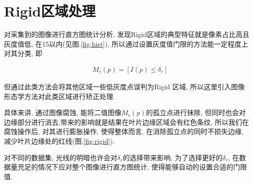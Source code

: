 
\section{Rigid区域处理}

对采集到的图像进行直方图统计分析, 发现Rigid区域的典型特征就是像素占比高且灰度值低, 在15以内(见图.\ref{fig:hist}),  所以通过设置灰度值门限的方法能一定程度上对其分类, 即

\begin{eqnarray}
	\quad M_r(p) = [I(p) \le \delta_r ]
\end{eqnarray}


但通过此类方法会将其他区域一些低灰度点误判为Rigid 区域, 所以这里引入图像形态学方法\cite{GonzalezW08}对此类区域进行矫正处理.


具体来讲, 通过图像腐蚀, 能将二值图像$M_r(p)$的孤立点进行抹除, 但同时也会对边缘部分进行消去,带来的影响就是结果在叶片边缘区域会有红色条纹, 所以我们在腐蚀操作后, 对其进行膨胀操作, 使得整体而言, 在消除孤立点的同时不损失边缘, 减少叶片边缘处的红线(图.\ref{fig:rigid}).

对不同的数据集, 光线的明暗也许会对$\delta_r$的选择带来影响, 为了选择更好的$\delta_r$, 在数据量充足的情况下应对整个图像进行直方图统计, 使得能够自动的设置合适的门限值.